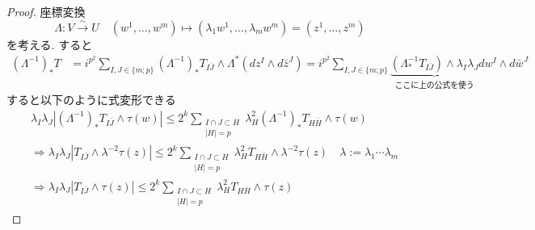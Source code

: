 \begin{proof}
座標変換
$$
\Lambda:V\overset{\sim}{\to} U
\quad
(w^1,\ldots,w^m)\longmapsto (\lambda_1w^1,\ldots,\lambda_mw^m)
=(z^1, \ldots, z^m)
$$を考える. 
すると
\begin{align*}
(\Lambda^{-1})_*T
&= i^{p^2}\sum_{I,J\in \{ m; p\}}
(\Lambda^{-1})_*T_{I\bar J}\wedge \Lambda^*(dz^I\wedge d\bar z^J) 
= i^{p^2}\sum_{I,J\in \{ m; p\}}
\underbrace{
(\Lambda^{-1}_*T_{I\bar J})
\wedge \lambda_I\lambda_J}_{\text{ここに上の公式を使う}}
dw^I\wedge d\bar w^J
\end{align*}
すると以下のように式変形できる
\begin{align*}
&\lambda_I\lambda_J\left|(\Lambda^{-1})_*T_{I\bar J}\wedge \tau(w)\right|
\leq
2^k\sum_{\substack{I\cap J\subset H\\ |H|=p}}\lambda_H^2(\Lambda^{-1})_*T_{H\bar H}\wedge \tau(w)
\\
&\Rightarrow
\lambda_I\lambda_J\left|T_{I\bar J}\wedge \lambda^{-2}\tau(z)\right|
\leq
2^k\sum_{\substack{I\cap J\subset H\\ |H|=p}}\lambda_H^2T_{H\bar H}\wedge \lambda^{-2}\tau(z)
\quad
\lambda:=\lambda_1\cdots\lambda_m
\\
&\Rightarrow
\lambda_I\lambda_J\left|T_{I\bar J}\wedge \tau(z)\right|
\leq
2^k\sum_{\substack{I\cap J\subset H\\ |H|=p}}\lambda_H^2T_{H\bar H}\wedge \tau(z)
\end{align*}

\end{proof}


